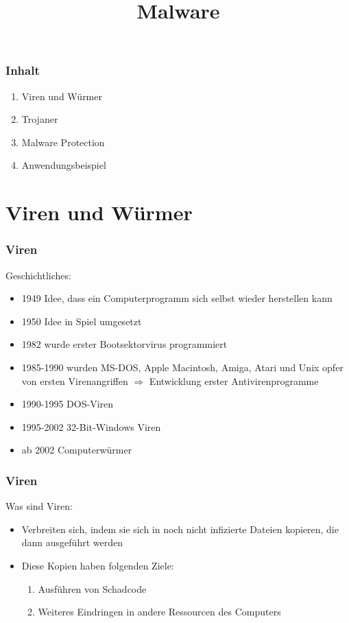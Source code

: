 \documentclass{beamer}
\title{Malware}
\author{}
\date{}
\begin{document}
\maketitle
\begin{frame}
	\frametitle{Inhalt}
	\begin{enumerate}
		\item Viren und Würmer
		\item Trojaner
		\item Malware Protection
		\item Anwendungsbeispiel
	\end{enumerate}
\end{frame}


\section{Viren und Würmer}
\begin{frame}
	\frametitle{Viren}
		\begin{block}{Geschichtliches:}
			\begin{itemize}
				\item 1949 Idee, dass ein Computerprogramm sich selbst wieder herstellen kann
				\item 1950 Idee in Spiel umgesetzt
				\item 1982 wurde erster Bootsektorvirus programmiert
				\item 1985-1990 wurden  MS-DOS, Apple Macintosh, Amiga, Atari und Unix opfer von ersten Virenangriffen
				$\Rightarrow$ Entwicklung erster Antivirenprogramme
				\item 1990-1995 DOS-Viren
				\item 1995-2002 32-Bit-Windows Viren
				\item ab 2002 Computerwürmer
			\end{itemize}
		\end{block}
\end{frame}

\begin{frame}
	\frametitle{Viren}
		\begin{block}{Was sind Viren:}
			\begin{itemize}
				\item Verbreiten sich, indem sie sich in noch nicht infizierte Dateien kopieren, die dann ausgeführt werden
				\item Diese Kopien haben folgenden Ziele:
				\begin{enumerate}
					\item Ausführen von Schadcode
					\item Weiteres Eindringen in andere Ressourcen des Computers
				\end{enumerate}
			\end{itemize}
		\end{block}
\end{frame}
\end{document}
